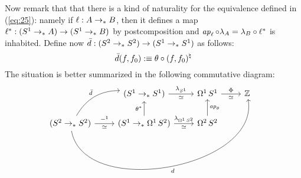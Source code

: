 \documentclass[english,a4]{article}
\begin{document}
Now remark that that there is a kind of naturality for the equivalence
defined in (\ref{eq:25}): namely if $\ell:A \to_\ast B$, then it defines
a map $\ell^\ast : ({S^1}\to_\ast A) \to ({S^1} \to_\ast B)$ by
postcomposition and
$\mathop{{\it ap}_{\ell}} \circ \lambda_A = \lambda_B \circ \ell^\ast$ is
inhabited. Define now $\bar d: ({S^2} \to_\ast {S^2}) \to ({S^1} \to_\ast {S^1})$
as follows:
\begin{equation}
  \label{eq:29}
  \bar d(f,f_0) \mathrel{\hbox{:}\mkern-5mu\equiv} \theta\circ(f,f_0)^\natural
\end{equation}
The situation is better summarized in the following commutative
diagram:
\begin{equation}
  \label{eq:30}
  \begin{tikzcd}
    {} & (\Sc \ptdto \Sc) \rar["\lambda_{\Sc}","\weq"swap] &
    \loopspace 1 \Sc \rar["\Phi","\weq"swap] & \ZZ
    \\
    (\Sp \ptdto \Sp) \rar["\blank^\natural","\weq"swap] \ar[ur,bend
    left,"\bar d"] \ar[urrr, bend
    right=90,"d"swap] & (\Sc \ptdto \loopspace 1 \Sp)
    \rar["\lambda_{\loopspace 1 \Sp}","\weq"swap] \uar["\theta^\ast"]
    & \loopspace 2 \Sp \uar["\ap\theta"swap] & 
  \end{tikzcd}
\end{equation}
\end{document}
